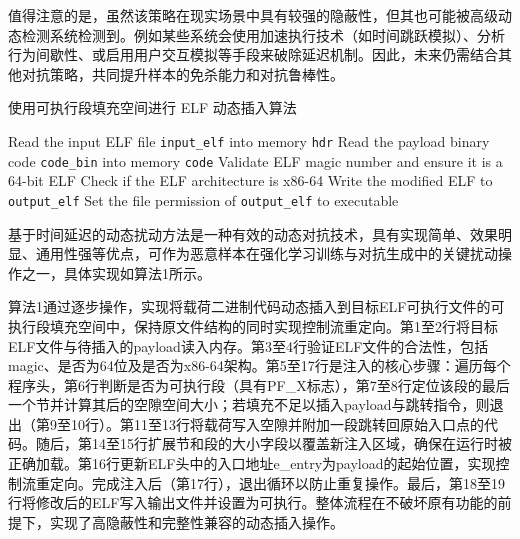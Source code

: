 值得注意的是，虽然该策略在现实场景中具有较强的隐蔽性，但其也可能被高级动态检测系统检测到。例如某些系统会使用加速执行技术（如时间跳跃模拟）、分析行为间歇性、或启用用户交互模拟等手段来破除延迟机制。因此，未来仍需结合其他对抗策略，共同提升样本的免杀能力和对抗鲁棒性。
\begin{algorithm}[htbp]
	\caption{使用可执行段填充空间进行 ELF 动态插入算法}
	Read the input ELF file \texttt{input\_elf} into memory \texttt{hdr}\;
	Read the payload binary code \texttt{code\_bin} into memory \texttt{code}\;
	Validate ELF magic number and ensure it is a 64-bit ELF\;
	Check if the ELF architecture is x86-64\;
	Write the modified ELF to \texttt{output\_elf}\;
	Set the file permission of \texttt{output\_elf} to executable\;
\end{algorithm}

基于时间延迟的动态扰动方法是一种有效的动态对抗技术，具有实现简单、效果明显、通用性强等优点，可作为恶意样本在强化学习训练与对抗生成中的关键扰动操作之一，具体实现如算法1所示。


算法1通过逐步操作，实现将载荷二进制代码动态插入到目标ELF可执行文件的可执行段填充空间中，保持原文件结构的同时实现控制流重定向。第1至2行将目标ELF文件与待插入的payload读入内存。第3至4行验证ELF文件的合法性，包括magic、是否为64位及是否为x86-64架构。第5至17行是注入的核心步骤：遍历每个程序头，第6行判断是否为可执行段（具有PF\_X标志），第7至8行定位该段的最后一个节并计算其后的空隙空间大小；若填充不足以插入payload与跳转指令，则退出（第9至10行）。第11至13行将载荷写入空隙并附加一段跳转回原始入口点的代码。随后，第14至15行扩展节和段的大小字段以覆盖新注入区域，确保在运行时被正确加载。第16行更新ELF头中的入口地址e\_entry为payload的起始位置，实现控制流重定向。完成注入后（第17行），退出循环以防止重复操作。最后，第18至19行将修改后的ELF写入输出文件并设置为可执行。整体流程在不破坏原有功能的前提下，实现了高隐蔽性和完整性兼容的动态插入操作。




